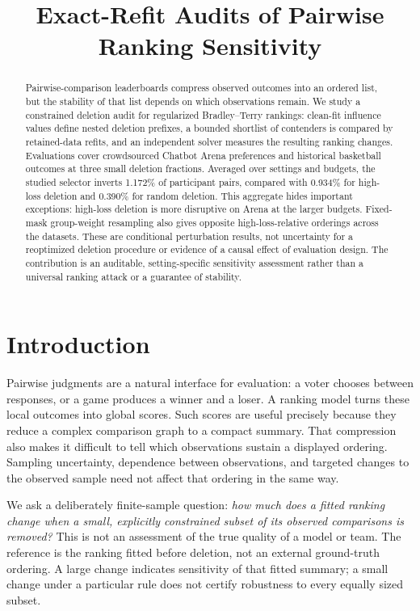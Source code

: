 \documentclass{article}
\title{Exact-Refit Audits of Pairwise Ranking Sensitivity}
\begin{document}
\maketitle

\begin{abstract}
Pairwise-comparison leaderboards compress observed outcomes into an ordered list, but the stability of that list depends on which observations remain. We study a constrained deletion audit for regularized Bradley--Terry rankings: clean-fit influence values define nested deletion prefixes, a bounded shortlist of contenders is compared by retained-data refits, and an independent solver measures the resulting ranking changes. Evaluations cover crowdsourced Chatbot Arena preferences and historical basketball outcomes at three small deletion fractions. Averaged over settings and budgets, the studied selector inverts 1.172\% of participant pairs, compared with 0.934\% for high-loss deletion and 0.390\% for random deletion. This aggregate hides important exceptions: high-loss deletion is more disruptive on Arena at the larger budgets. Fixed-mask group-weight resampling also gives opposite high-loss-relative orderings across the datasets. These are conditional perturbation results, not uncertainty for a reoptimized deletion procedure or evidence of a causal effect of evaluation design. The contribution is an auditable, setting-specific sensitivity assessment rather than a universal ranking attack or a guarantee of stability.
\end{abstract}

\section{Introduction}
Pairwise judgments are a natural interface for evaluation: a voter chooses between responses, or a game produces a winner and a loser. A ranking model turns these local outcomes into global scores. Such scores are useful precisely because they reduce a complex comparison graph to a compact summary. That compression also makes it difficult to tell which observations sustain a displayed ordering. Sampling uncertainty, dependence between observations, and targeted changes to the observed sample need not affect that ordering in the same way.

We ask a deliberately finite-sample question: \emph{how much does a fitted ranking change when a small, explicitly constrained subset of its observed comparisons is removed?} This is not an assessment of the true quality of a model or team. The reference is the ranking fitted before deletion, not an external ground-truth ordering. A large change indicates sensitivity of that fitted summary; a small change under a particular rule does not certify robustness to every equally sized subset.
\end{document}
